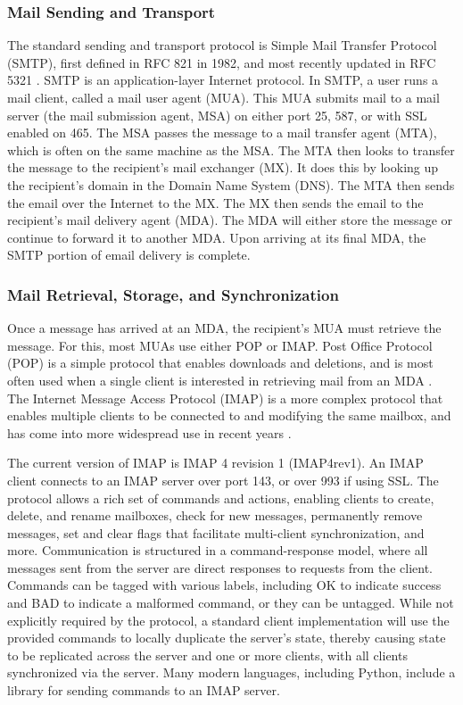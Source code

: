 \documentclass[pageno]{jpaper}
\begin{document}
\subsubsection{Mail Sending and Transport}
The standard sending and transport protocol is Simple Mail Transfer Protocol (SMTP), first defined in RFC 821 \cite{postel1982rfc} in 1982, and most recently updated in RFC 5321 \cite{klensin2008rfc}. SMTP is an application-layer Internet protocol. In SMTP, a user runs a mail client, called a mail user agent (MUA). This MUA submits mail to a mail server (the mail submission agent, MSA) on either port 25, 587, or with SSL enabled on 465. The MSA passes the message to a mail transfer agent (MTA), which is often on the same machine as the MSA. The MTA then looks to transfer the message to the recipient's mail exchanger (MX). It does this by looking up the recipient's domain in the Domain Name System (DNS). The MTA then sends the email over the Internet to the MX. The MX then sends the email to the recipient's mail delivery agent (MDA). The MDA will either store the message or continue to forward it to another MDA. Upon arriving at its final MDA, the SMTP portion of email delivery is complete.


\subsubsection{Mail Retrieval, Storage, and Synchronization}
\label{legacyimap}
Once a message has arrived at an MDA, the recipient's MUA must retrieve the message. For this, most MUAs use either POP or IMAP. Post Office Protocol (POP) is a simple protocol that enables downloads and deletions, and is most often used when a single client is interested in retrieving mail from an MDA \cite{reynolds1984post} \cite{myers1996post}. The Internet Message Access Protocol (IMAP) is a more complex protocol that enables multiple clients to be connected to and modifying the same mailbox, and has come into more widespread use in recent years \cite{rfc3501}.

The current version of IMAP is IMAP 4 revision 1 (IMAP4rev1). An IMAP client connects to an IMAP server over port 143, or over 993 if using SSL. The protocol allows a rich set of commands and actions, enabling clients to create, delete, and rename mailboxes, check for new messages, permanently remove messages, set and clear flags that facilitate multi-client synchronization, and more. Communication is structured in a command-response model, where all messages sent from the server are direct responses to requests from the client. Commands can be tagged with various labels, including OK to indicate success and BAD to indicate a malformed command, or they can be untagged. While not explicitly required by the protocol, a standard client implementation will use the provided commands to locally duplicate the server's state, thereby causing state to be replicated across the server and one or more clients, with all clients synchronized via the server. Many modern languages, including Python, include a library for sending commands to an IMAP server.
\end{document}
